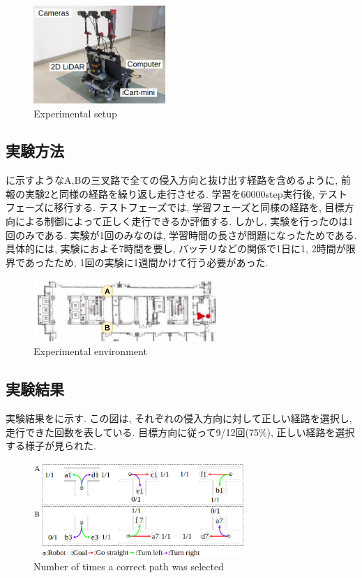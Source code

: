 \documentclass{jarticle}
\begin{document}
\begin{figure}[h]
  \centering
   \includegraphics[width=50mm]{gamma3.png}
   \vspace*{-4mm}
   \caption{Experimental setup}
   \label{fig: fig6}
 \end{figure}

 \subsection{実験方法}
 に示すようなA,Bの三叉路で全ての侵入方向と抜け出す経路を含めるように, 前報\cite{mech}の実験2と同様の経路を繰り返し走行させる. 学習を60000step実行後, テストフェーズに移行する. テストフェーズでは, 学習フェーズと同様の経路を, 目標方向による制御によって正しく走行できるか評価する. しかし, 実験を行ったのは1回のみである. 実験が1回のみなのは, 学習時間の長さが問題になったためである. 具体的には, 実験におよそ7時間を要し, バッテリなどの関係で1日に1, 2時間が限界であったため, 1回の実験に1週間かけて行う必要があった.

 \begin{figure}[h]
  \centering
   \includegraphics[width=70mm]{tsudanuma2.png}
   \vspace*{-4mm}
   \caption{Experimental environment}
   \label{fig: fig7}
 \end{figure}

\subsection{実験結果}
実験結果をに示す. この図は, それぞれの侵入方向に対して正しい経路を選択し, 走行できた回数を表している. 目標方向に従って9/12回(75\%), 正しい経路を選択する様子が見られた.

\begin{figure}[h]
  \centering
   \includegraphics[width=80mm]{60000step_real2.png}
   \vspace*{-4mm}
   \caption{Number of times a correct path was selected}
   \label{fig: fig8}
 \end{figure}
\end{document}
